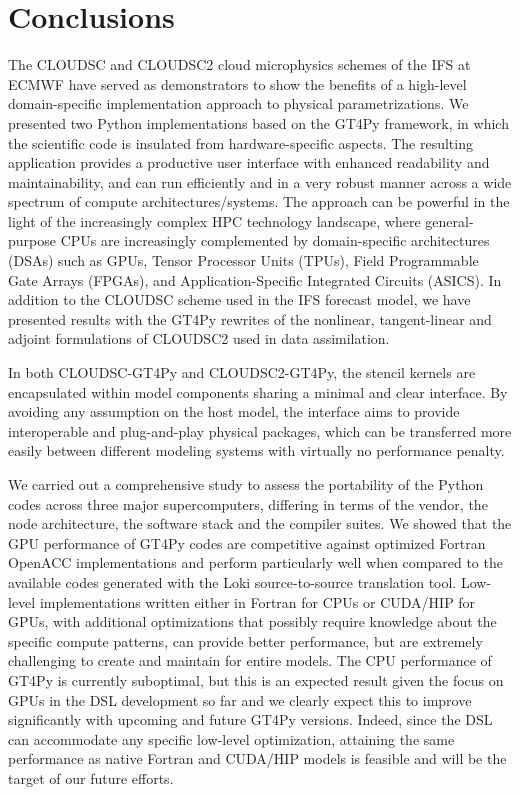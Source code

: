 \documentclass[gmd,manuscript,online]{copernicus}
\theoremstyle{theorem}
\theoremstyle{definition}
\theoremstyle{remark}
\theoremstyle{proposition}
\begin{document}
	\section{Conclusions}
	\label{section:conclusions}

	The CLOUDSC and CLOUDSC2 cloud microphysics schemes of the IFS at ECMWF have served as demonstrators to show the benefits of a high-level domain-specific implementation approach to physical parametrizations. We presented two Python implementations based on the GT4Py framework, in which the scientific code is insulated from hardware-specific aspects. The resulting application provides a productive user interface with enhanced readability and maintainability, and can run efficiently and in a very robust manner across a wide spectrum of compute architectures/systems. The approach can be powerful in the light of the increasingly complex HPC technology landscape, where general-purpose CPUs are increasingly complemented by domain-specific architectures (DSAs) such as GPUs, Tensor Processor Units (TPUs), Field Programmable Gate Arrays (FPGAs), and Application-Specific Integrated Circuits (ASICS). In addition to the CLOUDSC scheme used in the IFS forecast model, we have presented results with the GT4Py rewrites of the nonlinear, tangent-linear and adjoint formulations of CLOUDSC2 used in data assimilation.

	In both CLOUDSC-GT4Py and CLOUDSC2-GT4Py, the stencil kernels are encapsulated within model components sharing a minimal and clear interface. By avoiding any assumption on the host model, the interface aims to provide interoperable and plug-and-play physical packages, which can be transferred more easily between different modeling systems with virtually no performance penalty.

	We carried out a comprehensive study to assess the portability of the Python codes across three major supercomputers, differing in terms of the vendor, the node architecture, the software stack and the compiler suites. We showed that the GPU performance of GT4Py codes are competitive against optimized Fortran OpenACC implementations and perform particularly well when compared to the available codes generated with the Loki source-to-source translation tool. Low-level implementations written either in Fortran for CPUs or CUDA/HIP for GPUs, with additional optimizations that possibly require knowledge about the specific compute patterns, can provide better performance, but are extremely challenging to create and maintain for entire models. The CPU performance of GT4Py is currently suboptimal, but this is an expected result given the focus on GPUs in the DSL development so far and we clearly expect this to improve significantly with upcoming and future GT4Py versions. Indeed, since the DSL can accommodate any specific low-level optimization, attaining the same performance as native Fortran and CUDA/HIP models is feasible and will be the target of our future efforts.
\end{document}
